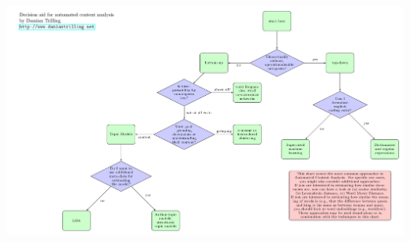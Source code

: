 \documentclass{beamer}
\begin{document}
\begin{frame}[plain]

\begin{center}
	\includegraphics[width=1\linewidth, height=1\textheight]{flowchart2}
	
\end{center}

\end{frame}
\end{document}
